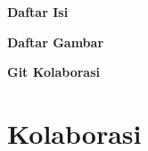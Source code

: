 \documentclass[12pt]{article}
\date{}
\begin{document}
	


	

\newpage

	\begin{center}
		\textbf{{\large Daftar Isi}}
	\end{center}
	
	\tableofcontents


\newpage

	\begin{center}
		\textbf{{\large Daftar Gambar}}
	\end{center}

	\listoffigures


\newpage

	\setcounter{page}{3}

	\setcounter{section}{0}
	
	\setcounter{figure}{0}
	
	\setcounter{subsubsection}{0}
	
	\begin{center}
		{\large \textbf{Git Kolaborasi}}
	\end{center}
	
	\section{Kolaborasi}
	
\end{document}
